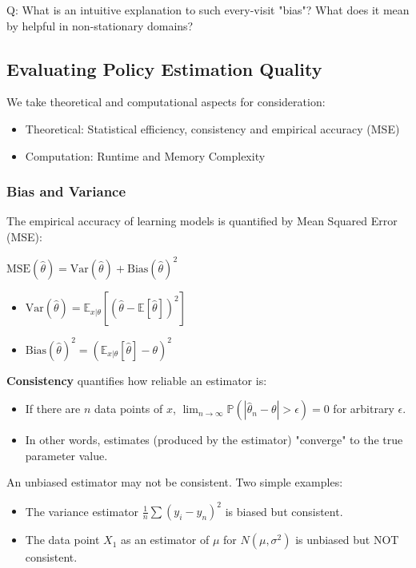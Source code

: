 \documentclass{article}
\begin{document}
\begin{hintbox}
    Q: What is an intuitive explanation to such every-visit "bias"? What does it mean by helpful in non-stationary domains?
\end{hintbox}

\subsection{Evaluating Policy Estimation Quality}
We take theoretical and computational aspects for consideration:
\begin{itemize}
\item Theoretical: Statistical efficiency, consistency and empirical accuracy (MSE) 
\item Computation: Runtime and Memory Complexity
\end{itemize}

\begin{defbox}
    \subsubsection{Bias and Variance}
    The empirical accuracy of learning models is quantified by Mean Squared Error (MSE):
    \begin{center}
        $\text{MSE}(\hat{\theta}) = \text{Var}(\hat{\theta}) + \text{Bias} (\hat{\theta})^2$
    \end{center}
    \begin{itemize}
    \item $\text{Var}(\hat{\theta}) = \mathbb{E}_{x | \theta} [(\hat{\theta} - \mathbb{E}[\hat{\theta}])^2]$
    \item $\text{Bias}(\hat{\theta})^2 = (\mathbb{E}_{x | \theta}[\hat{\theta}] - \theta)^2$
    \end{itemize}
\end{defbox}

\textbf{Consistency} quantifies how reliable an estimator is:
\begin{itemize}
\item If there are $n$ data points of $x$, $\lim_{n \to \infty} \mathbb{P}(|\hat{\theta}_n - \theta| > \epsilon) = 0$ for arbitrary $\epsilon$.
\item In other words, estimates (produced by the estimator) "converge" to the true parameter value.
\end{itemize}

\begin{hintbox}
    An unbiased estimator may not be consistent. Two simple examples:
    \begin{prfbox}
    \begin{itemize}
    \item The variance estimator $\frac{1}{n} \sum (y_i - y_n)^2$ is biased but consistent.
    \item The data point $X_1$ as an estimator of $\mu$ for $N(\mu, \sigma^2)$ is unbiased but NOT consistent.
    \end{itemize}
    \end{prfbox}
\end{hintbox}
\end{document}

